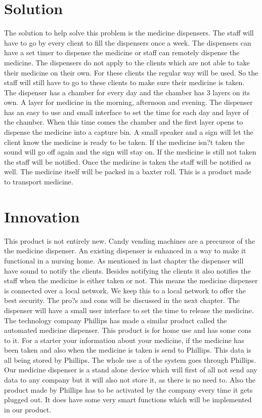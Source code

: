 \documentclass{article}
\begin{document}
\section{Solution}
The solution to help solve this problem is the medicine dispensers. The staff will have to go by every client to fill the dispensers once a week. The dispensers can have a set timer to dispense the medicine or staff can remotely dispense the medicine. The dispensers do not apply to the clients which are not able to take their medicine on their own. For these clients the regular way will be used. So the staff will still have to go to these clients to make sure their medicine is taken. 
The dispenser has a chamber for every day and the chamber has 3 layers on its own. A layer for medicine in the morning, afternoon and evening. The dispenser has an easy to use and small interface to set the time for each day and layer of the chamber. 
When this time comes the chamber and the first layer opens to dispense the medicine into a capture bin. A small speaker and a sign will let the client know the medicine is ready to be taken. If the medicine isn?t taken the sound will go off again and the sign will stay on. If the medicine is still not taken the staff will be notified. Once the medicine is taken the staff will be notified as well.
The medicine itself will be packed in a baxter roll\cite{braams:babel}. This is a product made to transport medicine. 

\section{Innovation}
This product is not entirely new. Candy vending machines are a precursor of the the medicine dispenser. An existing dispenser is enhanced in a way to make it functional in a nursing home. As mentioned in last chapter the dispenser will have sound to notify the clients. Besides notifying the clients it also notifies the staff when the medicine is either taken or not. This means the medicine dispenser is connected over a local network\cite{clark:pct}. We keep this to a local network to offer the best security. The pro?s and cons will be discussed in the next chapter. The dispenser will have a small user interface to set the time to release the medicine. 
The technology company Phillips has made a similar product called the automated medicine dispenser\cite{herlihy:methodology}. This product is for home use and has some cons to it. For a starter your information about your medicine, if the medicine has been taken and also when the medicine is taken is send to Phillips. This data is all being stored by Phillips. The whole use a of the system goes through Phillips. Our medicine dispenser is a stand alone device which will first of all not send any data to any company but it will also not store it, as there is no need to. Also the product made by Phillips has to be activated by the company every time it gets plugged out. It does have some very smart functions which will be implemented in our product.
\end{document}

